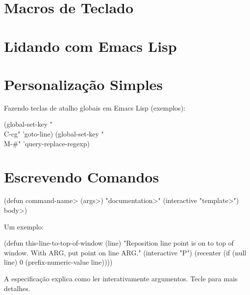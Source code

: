 \section{Macros de Teclado}


\section{Lidando com Emacs Lisp}


\section{Personaliza{\c{c}}{\~a}o Simples}



Fazendo teclas de atalho globais em Emacs Lisp (exemplos):

\beginexample%
(global-set-key "\\C-cg" 'goto-line)
(global-set-key "\\M-\#" 'query-replace-regexp)
\endexample

\section{Escrevendo Comandos}

\beginexample%
(defun \<command-name> (\<args>)
  "\<documentation>" (interactive "\<template>")
  \<body>)
\endexample

Um exemplo:

\beginexample%
(defun this-line-to-top-of-window (line)
  "Reposition line point is on to top of window.
With ARG, put point on line ARG."
  (interactive "P")
  (recenter (if (null line)
                0
              (prefix-numeric-value line))))
\endexample

A especifica{\c{c}}{\~a}o  explica como ler
interativamente argumentos.  Tecle  para mais
detalhes.

\copyrightnotice

\bye


